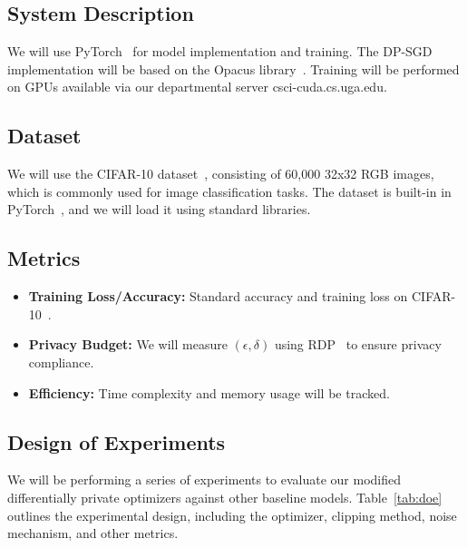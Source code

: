 \subsection{System Description}\label{subsec:system-description}
We will use PyTorch~\cite{pytorch_2019} for model implementation and training.
The DP-SGD~\cite{Abadi_2016_DeepLearningDifferentialPrivacy} implementation will be based on the Opacus library~\cite{opacus}.
Training will be performed on GPUs available via our departmental server csci-cuda.cs.uga.edu.

\subsection{Dataset}\label{subsec:dataset}
We will use the CIFAR-10 dataset~\cite{cifar10_dataset}, consisting of 60,000 32x32 RGB images, which is commonly used for
image classification tasks.
The dataset is built-in in PyTorch~\cite{pytorch_2019}, and we will load it using standard libraries.

\subsection{Metrics}\label{subsec:metrics}
\begin{itemize}
    \item \textbf{Training Loss/Accuracy:} Standard accuracy and training loss on CIFAR-10~\cite{cifar10_dataset}.
    \item \textbf{Privacy Budget:} We will measure $(\epsilon, \delta)$ using RDP~\cite{Mironov_2017_RenyiDP} to ensure privacy compliance.
    \item \textbf{Efficiency:} Time complexity and memory usage will be tracked.
\end{itemize}

\subsection{Design of Experiments}\label{subsec:design-of-experiments}
We will be performing a series of experiments to evaluate our modified differentially private optimizers against other baseline models.
Table~\ref{tab:doe} outlines the experimental design, including the optimizer, clipping method, noise mechanism, and other metrics.

